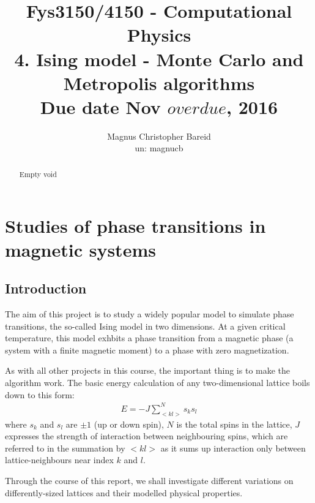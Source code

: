 \documentclass[11pt,a4paper,notitlepage,twocolumn]{article}
\title{\normalsize Fys3150/4150 - Computational Physics\\
\vspace{10mm}
\huge 4. Ising model - Monte Carlo and Metropolis algorithms\\
\vspace{10mm}
\normalsize Due date {\bf Nov $overdue$, 2016}}
\author{Magnus Christopher Bareid \\ un: magnucb }
\begin{document}
\noindent
\maketitle
\vspace{5mm}




\begin{abstract}
Empty void %
\end{abstract}




\newpage
\tableofcontents

\newpage

\section{Studies of phase transitions in magnetic systems}
\subsection{Introduction}
The aim of this project is to study a widely popular model to simulate phase transitions, the so-called Ising model in two dimensions. At a given critical temperature, this model exhbits a phase transition from a magnetic phase (a system with a finite magnetic moment) to a phase with zero magnetization.

As with all other projects in this course, the important thing is to make the algorithm work. The basic energy calculation of any two-dimensional lattice boils down to this form:
\begin{align}\label{eq:energysummation}
E = -J \sum^N_{<kl>} s_ks_l
\end{align}
where $s_k$ and $s_l$ are $\pm 1$ (up or down spin), $N$ is the total spins in the lattice, $J$ expresses the strength of interaction between neighbouring spins, which are referred to in the summation by $<kl>$ as it sums up interaction only between lattice-neighbours near index $k$ and $l$.

Through the course of this report, we shall investigate different variations on differently-sized lattices and their modelled physical properties.
\end{document}
